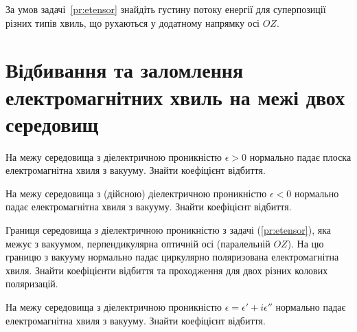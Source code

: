 \begin{problem}
За умов задачі~\ref{pr:etensor} знайдіть густину потоку енергії для суперпозиції різних типів хвиль,
що рухаються у додатному напрямку осі $OZ$.
\end{problem}





\section{Відбивання та заломлення електромагнітних хвиль на межі двох середовищ}






\begin{problem}
На межу середовища з діелектричною проникністю $\epsilon > 0 $  нормально падає плоска електромагнітна
хвиля з вакууму. Знайти коефіцієнт відбиття.
\end{problem}

\begin{problem}
На межу середовища з (дійсною) діелектричною проникністю  $\epsilon < 0 $  нормально падає
електромагнітна хвиля з вакууму. Знайти коефіцієнт відбиття.
\end{problem}

\begin{problem}%
Границя середовища з діелектричною проникністю з задачі (\ref{pr:etensor}), яка межує з вакуумом,
перпендикулярна оптичній осі (паралельній $OZ$). На цю границю з вакууму нормально падає циркулярно
поляризована електромагнітна хвиля. Знайти коефіцієнти відбиття та проходження для двох різних колових
поляризацій.
\end{problem}

\begin{problem}
На межу середовища з діелектричною проникністю $\epsilon = \epsilon' + i\epsilon''$  нормально падає
електромагнітна хвиля з вакууму. Знайти коефіцієнт відбиття.
\end{problem}

